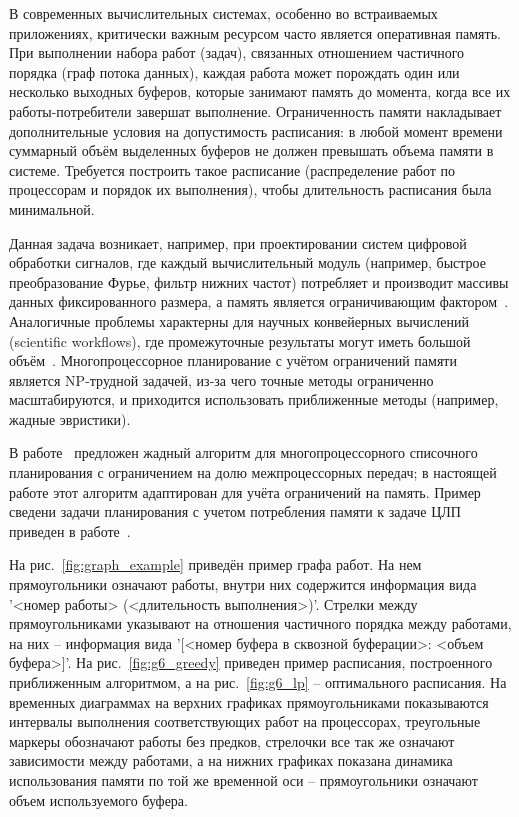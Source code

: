 \label{sec:0_vvedenie} 

В современных вычислительных системах, особенно во встраиваемых приложениях, критически важным ресурсом часто является оперативная память. При выполнении набора работ (задач), связанных отношением частичного порядка (граф потока данных), каждая работа может порождать один или несколько выходных буферов, которые занимают память до момента, когда все их работы-потребители завершат выполнение. Ограниченность памяти накладывает дополнительные условия на допустимость расписания: в любой момент времени суммарный объём выделенных буферов не должен превышать объема памяти в системе. Требуется построить такое расписание (распределение работ по процессорам и порядок их выполнения), чтобы длительность расписания была минимальной.

Данная задача возникает, например, при проектировании систем цифровой обработки сигналов, где каждый вычислительный модуль (например, быстрое преобразование Фурье, фильтр нижних частот) потребляет и производит массивы данных фиксированного размера, а память является ограничивающим фактором~\cite{Ershov1962}. Аналогичные проблемы характерны для научных конвейерных вычислений (scientific workflows), где промежуточные результаты могут иметь большой объём~\cite{ScientificWorkflows}. Многопроцессорное планирование с учётом ограничений памяти является NP-трудной задачей, из-за чего точные методы ограниченно масштабируются, и приходится использовать приближенные методы (например, жадные эвристики).

В работе~\cite{Savitsky2023} предложен жадный алгоритм для многопроцессорного списочного планирования с ограничением на долю межпроцессорных передач; в настоящей работе этот алгоритм адаптирован для учёта ограничений на память. Пример сведени задачи планирования с учетом потребления памяти к задаче ЦЛП приведен в работе~\cite{Senyushkina2025}.

На рис.~\ref{fig:graph_example} приведён пример графа работ. На нем прямоугольники означают работы, внутри них содержится информация вида '<номер работы> (<длительность выполнения>)'. Стрелки между прямоугольниками указывают на отношения частичного порядка между работами, на них -- информация вида '[<номер буфера в сквозной буферации>: <объем буфера>]'. На рис.~\ref{fig:g6_greedy} приведен пример расписания, построенного приближенным алгоритмом, а на рис.~\ref{fig:g6_lp} -- оптимального расписания. На временных диаграммах на верхних графиках прямоугольниками показываются интервалы выполнения соответствующих работ на процессорах, треугольные маркеры обозначают работы без предков, стрелочки все так же означают зависимости между работами, а на нижних графиках показана динамика использования памяти по той же временной оси -- прямоугольники означают объем используемого буфера.

